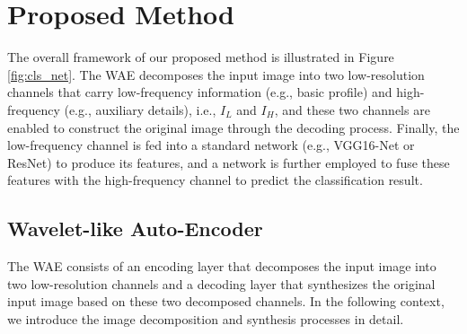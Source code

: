 \documentclass[letterpaper]{article} %
\begin{document}
\section{Proposed Method}
The overall framework of our proposed method is illustrated in Figure \ref{fig:cls_net}. The WAE decomposes the input image into two low-resolution channels that carry low-frequency information (e.g., basic profile) and high-frequency (e.g., auxiliary details), i.e., $I_L$ and $I_H$, and these two channels are enabled to construct the original image through the decoding process. Finally, the low-frequency channel is fed into a standard network (e.g., VGG16-Net or ResNet) to produce its features, and a network is further employed to fuse these features with the high-frequency channel to predict the classification result.

\subsection{Wavelet-like Auto-Encoder}
The WAE consists of an encoding layer that decomposes the input image into two low-resolution channels and a decoding layer that synthesizes the original input image based on these two decomposed channels. In the following context, we introduce the image decomposition and synthesis processes in detail.
\end{document}

